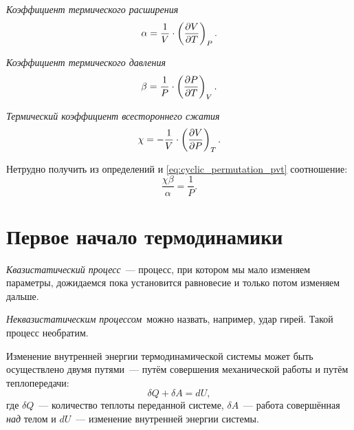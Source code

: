 \documentclass[../main.tex]{subfiles}
\begin{document}
    \begin{definition}
        \emph{Коэффициент термического расширения}
        \begin{equation}
            \alpha  =   \frac{1}{V} \cdot \left(\dfrac{\partial V}{\partial T}\right)_{P}.
        \end{equation}
    \end{definition}

    \begin{definition}
        \emph{Коэффициент термического давления}
        \begin{equation}
            \beta   =   \frac{1}{P} \cdot \left(\dfrac{\partial P}{\partial T}\right)_{V}.
        \end{equation}
    \end{definition}
    
    \begin{definition}
        \emph{Термический коэффициент всестороннего сжатия}
        \begin{equation}
            \chi    = - \frac{1}{V} \cdot \left(\dfrac{\partial V}{\partial P}\right)_{T}.
        \end{equation}
    \end{definition}
    \begin{corollary}
        Нетрудно получить из определений и \eqref{eq:cyclic_permutation_pvt} соотношение:
        \begin{equation}
            \frac{\chi \beta}{\alpha} = \frac{1}{P}.
        \end{equation}
    \end{corollary}

    \section{Первое начало термодинамики} 

    \begin{definition}
        \emph{Квазистатический процесс}~--- процесс, при котором мы мало изменяем параметры, дожидаемся пока установится равновесие и только потом изменяем дальше.
    \end{definition}
    \begin{addition}
        \emph{Неквазистатическим процессом}~можно назвать, например, удар гирей. Такой процесс необратим.
    \end{addition}

    \begin{proposition}
        Изменение внутренней энергии термодинамической системы может быть осуществлено двумя путями~--- путём совершения механической работы и путём теплопередачи:
        \begin{equation}
            \delta Q + \delta A = dU,
        \end{equation}
        где $\delta Q$~--- количество теплоты переданной системе, $\delta A$~--- работа совершённая \emph{над} телом и $dU$~--- изменение внутренней энергии системы.
    \end{proposition}
\end{document}

